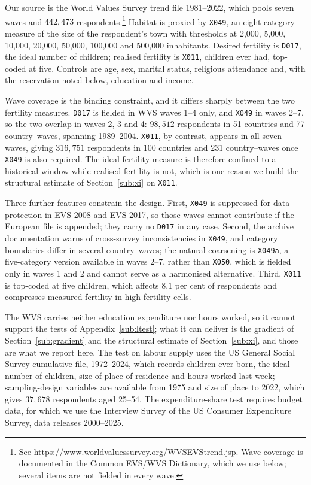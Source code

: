 \documentclass[11pt]{article}
\begin{document}
Our source is the World Values Survey trend file 1981--2022, which pools seven waves and
$442{,}473$ respondents.\footnote{See \url{https://www.worldvaluessurvey.org/WVSEVStrend.jsp}.
Wave coverage is documented in the Common EVS/WVS Dictionary, which we use below; several items
are not fielded in every wave.} Habitat is proxied by \texttt{X049}, an eight-category measure of
the size of the respondent's town with thresholds at 2{,}000, 5{,}000, 10{,}000, 20{,}000,
50{,}000, 100{,}000 and 500{,}000 inhabitants. Desired fertility is \texttt{D017}, the ideal number
of children; realised fertility is \texttt{X011}, children ever had, top-coded at five. Controls
are age, sex, marital status, religious attendance and, with the reservation noted below, education
and income.

Wave coverage is the binding constraint, and it differs sharply between the two fertility measures.
\texttt{D017} is fielded in WVS waves 1--4 only, and \texttt{X049} in waves 2--7, so the two
overlap in waves 2, 3 and 4: $98{,}512$ respondents in 51 countries and 77 country--waves, spanning
1989--2004. \texttt{X011}, by contrast, appears in all seven waves, giving $316{,}751$ respondents
in 100 countries and 231 country--waves once \texttt{X049} is also required. The ideal-fertility
measure is therefore confined to a historical window while realised fertility is not, which is one
reason we build the structural estimate of Section~\ref{sub:xi} on \texttt{X011}.

Three further features constrain the design. First, \texttt{X049} is suppressed for data protection
in EVS 2008 and EVS 2017, so those waves cannot contribute if the European file is appended; they
carry no \texttt{D017} in any case. Second, the archive documentation warns of cross-survey
inconsistencies in \texttt{X049}, and category boundaries differ in several country--waves; the
natural coarsening is \texttt{X049a}, a five-category version available in waves 2--7, rather than
\texttt{X050}, which is fielded only in waves 1 and 2 and cannot serve as a harmonised alternative.
Third, \texttt{X011} is top-coded at five children, which affects $8.1$ per cent of respondents and
compresses measured fertility in high-fertility cells.

The WVS carries neither education expenditure nor hours worked, so it cannot support the tests of
Appendix~\ref{sub:ltest}; what it can deliver is the gradient of Section~\ref{sub:gradient} and the
structural estimate of Section~\ref{sub:xi}, and those are what we report here. The test
on labour supply uses the US General Social Survey cumulative file, 1972--2024, which records
children ever born, the ideal number of children, size of place of residence and hours worked last
week; sampling-design variables are available from 1975 and size of place to 2022, which gives
$37{,}678$ respondents aged 25--54. The expenditure-share test requires budget data, for which we use the Interview Survey of
the US Consumer Expenditure Survey, data releases 2000--2025.
\end{document}
